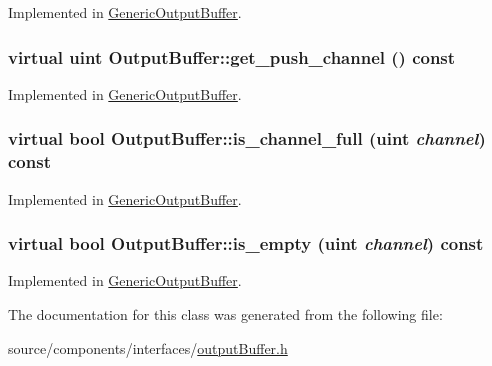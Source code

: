 Implemented in \hyperlink{classGenericOutputBuffer_c3e3831a4eb7b09b053b511722e89daf}{GenericOutputBuffer}.\hypertarget{classOutputBuffer_bafd65458146d9b383643fef94b38881}{
\subsubsection[{get\_\-push\_\-channel}]{\setlength{\rightskip}{0pt plus 5cm}virtual {\bf uint} OutputBuffer::get\_\-push\_\-channel () const}}
\label{classOutputBuffer_bafd65458146d9b383643fef94b38881}




Implemented in \hyperlink{classGenericOutputBuffer_d7f10031a96719bc97a11d3a96f4ef6f}{GenericOutputBuffer}.\hypertarget{classOutputBuffer_23aaeb2aa62e944596d50a569ed5d859}{
\subsubsection[{is\_\-channel\_\-full}]{\setlength{\rightskip}{0pt plus 5cm}virtual bool OutputBuffer::is\_\-channel\_\-full ({\bf uint} {\em channel}) const}}
\label{classOutputBuffer_23aaeb2aa62e944596d50a569ed5d859}




Implemented in \hyperlink{classGenericOutputBuffer_cc3ce27817dea583b8c0cb269b3c9cdb}{GenericOutputBuffer}.\hypertarget{classOutputBuffer_7cba09e2dbb3794d873862b5066fd085}{
\subsubsection[{is\_\-empty}]{\setlength{\rightskip}{0pt plus 5cm}virtual bool OutputBuffer::is\_\-empty ({\bf uint} {\em channel}) const}}
\label{classOutputBuffer_7cba09e2dbb3794d873862b5066fd085}




Implemented in \hyperlink{classGenericOutputBuffer_df867815a21d8e832ba19aa63fa65e55}{GenericOutputBuffer}.

The documentation for this class was generated from the following file:\begin{CompactItemize}
\item 
source/components/interfaces/\hyperlink{outputBuffer_8h}{outputBuffer.h}\end{CompactItemize}
